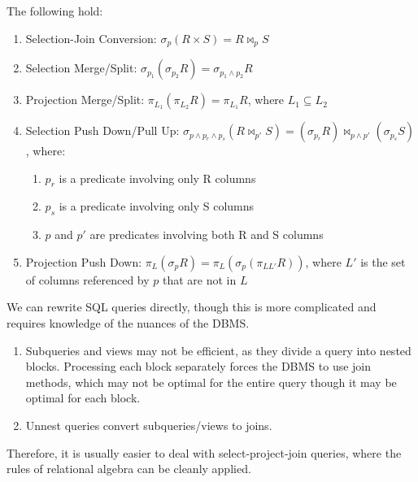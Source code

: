     \begin{theorem}[Identities]
      The following hold:
      \begin{enumerate}
        \item Selection-Join Conversion: $\sigma_p(R \times S) = R \bowtie_p S$
        \item Selection Merge/Split: $\sigma_{p_1}(\sigma_{p_2}R) = \sigma_{p_1 \wedge p_2}R$
        \item Projection Merge/Split: $\pi_{L_1}(\pi_{L_2}R) = \pi_{L_1}R$, where $L_1 \subseteq L_2$
        \item Selection Push Down/Pull Up: $\sigma_{p \wedge p_r \wedge p_s}(R \bowtie_{p'} S) = (\sigma_{p_r}R) \bowtie_{p \wedge p'} (\sigma_{p_s}S)$, where:
          \begin{enumerate}
            \item $p_r$ is a predicate involving only R columns
            \item $p_s$ is a predicate involving only S columns
            \item $p$ and $p'$ are predicates involving both R and S columns
          \end{enumerate}
        \item Projection Push Down: $\pi_L(\sigma_p R) = \pi_L(\sigma_p(\pi_{L L'}R))$, where $L'$ is the set of columns referenced by $p$ that are not in $L$
      \end{enumerate}
    \end{theorem} 

    \begin{definition}
      We can rewrite SQL queries directly, though this is more complicated and requires knowledge of the nuances of the DBMS. 
      \begin{enumerate}
        \item Subqueries and views may not be efficient, as they divide a query into nested blocks. Processing each block separately forces the DBMS to use join methods, which may not be optimal for the entire query though it may be optimal for each block. 
        \item Unnest queries convert subqueries/views to joins. 
      \end{enumerate}
      Therefore, it is usually easier to deal with select-project-join queries, where the rules of relational algebra can be cleanly applied. 
    \end{definition} 

